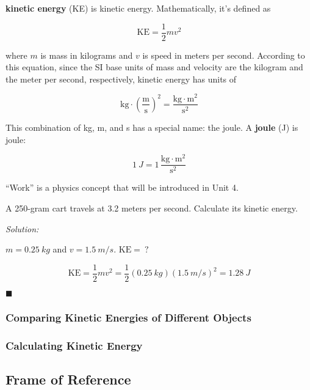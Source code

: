 \documentclass[dvipsnames]{article}
\begin{document}

\textbf{\Gls{kinetic energy}} (KE) is \glsdesc{kinetic energy}. Mathematically, it's defined as

\begin{equation*}
    \mathrm{KE} = \frac{1}{2} m v^2
\end{equation*}

where $m$ is mass in kilograms and $v$ is speed in meters per second. According to this equation, since the SI base units of mass and velocity are the kilogram and the meter per second, respectively, kinetic energy has units of

\begin{equation*}
    \mathrm{kg} \cdot \left(\mathrm{\frac{m}{s}}\right)^2 = \mathrm{\frac{kg\cdot m^2}{s^2}}
\end{equation*}

This combination of kg, m, and s has a special name: the joule. A \textbf{\gls{joule}} (J) is \glsdesc{joule}:

\begin{equation*}
    \SI{1}{J} = 1\,\mathrm{\frac{kg\cdot m^2}{s^2}}
\end{equation*}

``Work'' is a physics concept that will be introduced in Unit 4.

\begin{example}
A 250-gram cart travels at 3.2 meters per second. Calculate its kinetic energy. 
\end{example}

\textit{Solution:}

$m = \SI{0.25}{kg}$ and $v = \SI{1.5}{m/s}$. $\mathrm{KE} =\ ?$

\begin{equation*}
    \mathrm{KE} = \frac{1}{2} mv^2 = \frac{1}{2}(\SI{0.25}{kg})(\SI{1.5}{m/s})^2 = \boxed{\SI{1.28}{J}} 
\end{equation*}

\hfill $\blacksquare$

\subsubsection{Comparing Kinetic Energies of Different Objects}

\subsubsection{Calculating Kinetic Energy}

\subsection{Frame of Reference}
\end{document}
